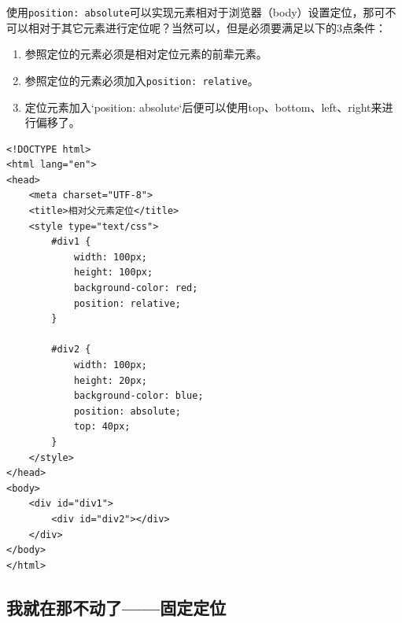 \begin{figure}[H]
    \centering
\end{figure}

使用\lstinline|position: absolute|可以实现元素相对于浏览器（body）设置定位，那可不可以相对于其它元素进行定位呢？当然可以，但是必须要满足以下的3点条件：

\begin{enumerate}
    \item 参照定位的元素必须是相对定位元素的前辈元素。
    \item 参照定位的元素必须加入\lstinline|position: relative|。
    \item 定位元素加入`position: absolute`后便可以使用top、bottom、left、right来进行偏移了。
\end{enumerate}

\begin{lstlisting}[style=htmlcssjs, title=相对父元素定位]
<!DOCTYPE html>
<html lang="en">
<head>
    <meta charset="UTF-8">
    <title>相对父元素定位</title>
    <style type="text/css">
        #div1 {
            width: 100px;
            height: 100px;
            background-color: red;
            position: relative;
        }

        #div2 {
            width: 100px;
            height: 20px;
            background-color: blue;
            position: absolute;
            top: 40px;
        }
    </style>
</head>
<body>
    <div id="div1">
        <div id="div2"></div>
    </div>
</body>
</html>
\end{lstlisting}

\begin{figure}[H]
    \centering
\end{figure}

\subsection{我就在那不动了——固定定位}

